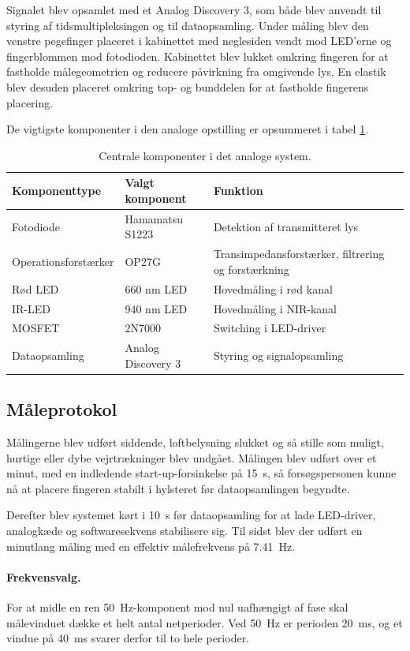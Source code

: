 Signalet blev opsamlet med et Analog Discovery 3, som både blev anvendt til styring af tidsmultipleksingen og til dataopsamling. Under måling blev den venstre pegefinger placeret i kabinettet med neglesiden vendt mod LED'erne og fingerblommen mod fotodioden. Kabinettet blev lukket omkring fingeren for at fastholde målegeometrien og reducere påvirkning fra omgivende lys. En elastik blev desuden placeret omkring top- og bunddelen for at fastholde fingerens placering.

De vigtigste komponenter i den analoge opstilling er opsummeret i tabel \ref{tab:centrale_komponenter}.

\begin{table}[h]
\centering
\caption{Centrale komponenter i det analoge system.}
\label{tab:centrale_komponenter}
\begin{tabular}{lll}
\toprule
Komponenttype & Valgt komponent & Funktion \\
\midrule
Fotodiode & Hamamatsu S1223 & Detektion af transmitteret lys \\
Operationsforstærker & OP27G & Transimpedansforstærker, filtrering og forstærkning \\
Rød LED & 660 nm LED & Hovedmåling i rød kanal \\
IR-LED & 940 nm LED & Hovedmåling i NIR-kanal \\
MOSFET & 2N7000 & Switching i LED-driver \\
Dataopsamling & Analog Discovery 3 & Styring og signalopsamling \\
\bottomrule
\end{tabular}
\end{table}

\subsection{Måleprotokol} 
Målingerne blev udført siddende, loftbelysning slukket og så stille som muligt, hurtige eller dybe vejrtrækninger blev undgået. Målingen blev udført over et minut, med en indledende start-up-forsinkelse på \SI{15}{s}, så forsøgspersonen kunne nå at placere fingeren stabilt i hylsteret før dataopsamlingen begyndte.

Derefter blev systemet kørt i \SI{10}{s} før dataopsamling for at lade LED-driver, analogkæde og softwaresekvens stabilisere sig. Til sidst blev der udført en minutlang måling med en effektiv målefrekvens på \SI{7.41}{Hz}.

\paragraph{Frekvensvalg.} For at midle en ren \SI{50}{Hz}-komponent mod nul uafhængigt af fase skal målevinduet dække et helt antal netperioder. Ved \SI{50}{Hz} er perioden \SI{20}{ms}, og et vindue på \SI{40}{ms} svarer derfor til to hele perioder.

